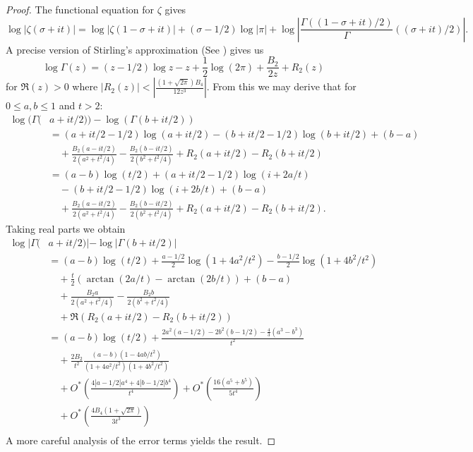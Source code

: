 \documentclass[10pt,english,letter, reqno]{amsart}
\newcommand{\Ostar}{O^{\ast}}
\theoremstyle{plain}
\theoremstyle{definition}
\begin{document}
\begin{proof}
The functional equation for $\zeta$ gives
\[  \log|\zeta(\sigma+it)| = \log|\zeta(1-\sigma+it)| +(\sigma-1/2)\log|\pi| + \log\left| \frac{\Gamma((1-\sigma+it)/2)}\Gamma((\sigma+it)/2)\right|.\]
A precise  version of Stirling's approximation (See \cite[Section~2]{Brent2019}) gives us
\[ \log\Gamma(z) = (z-1/2)\log z - z + \frac{1}{2}\log(2\pi) + \frac{B_{2}}{2z} + R_2(z) \]
for $\Re(z)>0$ where $|R_2(z)| < |\frac{(1+\sqrt{2\pi})B_{4}}{12z^3}|$.
From this we may derive that for $0\leq a,b \leq 1$ and $t>2$:
\begin{align*}
 \log(\Gamma(& a+it/2))- \log(\Gamma(b+it/2)) \\
 &= (a+it/2-1/2)\log(a+it/2) - (b+it/2-1/2)\log(b+it/2) + (b-a) \\&\quad+ \frac{B_2(a-it/2)}{2(a^2+t^2/4)} - \frac{B_2(b-it/2)}{2(b^2+t^2/4)} + R_2(a+it/2) - R_2(b+it/2)\\
 &= (a-b)\log(t/2) + (a+it/2-1/2)\log(i+2a/t)
 \\&\quad - (b+it/2-1/2)\log(i+2b/t) + (b-a)
 \\&\quad+ \frac{B_2(a-it/2)}{2(a^2+t^2/4)} - \frac{B_2(b-it/2)}{2(b^2+t^2/4)} + R_2(a+it/2) - R_2(b+it/2).
\end{align*}
Taking real parts we obtain
\begin{align*}
 \log|\Gamma(& a+it/2)| - \log|\Gamma(b+it/2)| \\
 &= (a-b)\log(t/2) + \frac{a-1/2}{2}\log(1+4a^2/t^2)  - \frac{b-1/2}{2}\log(1+4b^2/t^2)\\&\quad + \frac{t}{2}\left(\arctan\left(2a/t\right) - \arctan\left(2b/t\right)\right) + (b-a)
  \\&\quad + \frac{B_2 a }{2(a^2+t^2/4)}-\frac{B_2 b }{2(b^2+t^2/4)}
  \\&\quad + \Re( R_2(a+it/2) - R_2(b+it/2) )\\
&=(a-b)\log\left(t/2\right) +
\frac{2a^2(a-1/2) - 2b^2(b-1/2) - \frac{4}{3}(a^3-b^3)}{t^2}
\\&\quad + \frac{2B_2}{t^2}\frac{(a-b)(1-4ab/t^2)}{(1 + 4a^2/t^2)(1 + 4b^2/t^2)  }
\\&\quad + \Ostar\!\left(  \frac{4|a-1/2|a^4 + 4|b-1/2|b^4}{t^4} \right) + \Ostar\!\left(\frac{16(a^5+b^5)}{5t^4}\right)
\\&\quad + \Ostar\!\left( \frac{4B_4(1+\sqrt{2\pi})}{3t^3} \right)\\
 \end{align*}
A more careful analysis of the error terms yields the result.


\end{proof}
\end{document}
